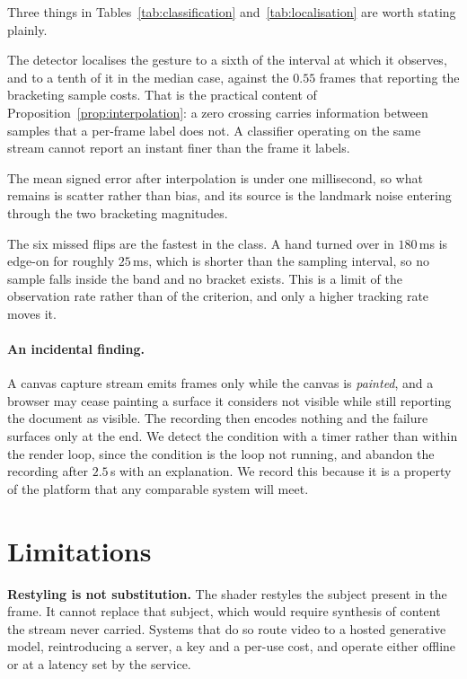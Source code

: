 \documentclass{article}
\theoremstyle{definition}
\begin{document}
Three things in Tables~\ref{tab:classification} and~\ref{tab:localisation} are
worth stating plainly.

The detector localises the gesture to a sixth of the interval at which it
observes, and to a tenth of it in the median case, against the $0.55$ frames that
reporting the bracketing sample costs. That is the practical content of
Proposition~\ref{prop:interpolation}: a zero crossing carries information between
samples that a per-frame label does not. A classifier operating on the same
stream cannot report an instant finer than the frame it labels.

The mean signed error after interpolation is under one millisecond, so what
remains is scatter rather than bias, and its source is the landmark noise
entering through the two bracketing magnitudes.

The six missed flips are the fastest in the class. A hand turned over in
$180$\,ms is edge-on for roughly $25$\,ms, which is shorter than the sampling
interval, so no sample falls inside the band and no bracket exists. This is a
limit of the observation rate rather than of the criterion, and only a higher
tracking rate moves it.

\paragraph{An incidental finding.}
A canvas capture stream emits frames only while the canvas is \emph{painted}, and
a browser may cease painting a surface it considers not visible while still
reporting the document as visible. The recording then encodes nothing and the
failure surfaces only at the end. We detect the condition with a timer rather
than within the render loop, since the condition is the loop not running, and
abandon the recording after $2.5$\,s with an explanation. We record this because
it is a property of the platform that any comparable system will meet.

\section{Limitations}
\label{sec:limitations}

\textbf{Restyling is not substitution.} The shader restyles the subject present
in the frame. It cannot replace that subject, which would require synthesis of
content the stream never carried. Systems that do so route video to a hosted
generative model, reintroducing a server, a key and a per-use cost, and operate
either offline or at a latency set by the service.
\end{document}
